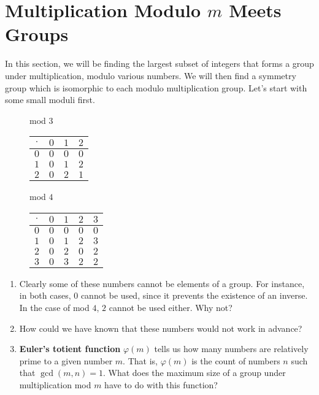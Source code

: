 \documentclass[../gatm.tex]{subfiles}
\begin{document}
\section{Multiplication Modulo $m$ Meets Groups}
\setcounter{problem_i}{0}

In this section, we will be finding the largest subset of integers that forms a group under multiplication, modulo various numbers. We will then find a symmetry group which is isomorphic to each modulo multiplication group. Let's start with some small moduli first.

\begin{figure}[h]
	\begin{center}
		\begin{minipage}[t]{0.45\textwidth}
			\centering
			mod $3$ \\
			\vspace*{\baselineskip}
			\begin{tabular}{c|ccc}
				\hline
				$\cdot$ & $0$ & $1$ & $2$ \\ \hline
				\rowcolor{light-gray}
				$0$ & $0$ & $0$ & $0$ \\
				$1$ & $0$ & $1$ & $2$ \\
				\rowcolor{light-gray}
				$2$ & $0$ & $2$ & $1$ \\ \hline
			\end{tabular}
		\end{minipage}
		\hfill
		\begin{minipage}[t]{0.45\textwidth}
			\centering
			mod $4$ \\
			\vspace*{\baselineskip}
			\begin{tabular}{c|cccc}
				\hline
				$\cdot$ & $0$ & $1$ & $2$ & $3$ \\ \hline
				\rowcolor{light-gray}
				$0$ & $0$ & $0$ & $0$ & $0$ \\
				$1$ & $0$ & $1$ & $2$ & $3$ \\
				\rowcolor{light-gray}
				$2$ & $0$ & $2$ & $0$ & $2$ \\
				$3$ & $0$ & $3$ & $2$ & $2$ \\ \hline
			\end{tabular}
		\end{minipage}
	\end{center}
\end{figure}

\begin{enumerate}
\item Clearly some of these numbers cannot be elements of a group. For instance, in both cases, $0$ cannot be used, since it prevents the existence of an inverse. In the case of mod $4$, $2$ cannot be used either. Why not?
\item How could we have known that these numbers would not work in advance?
\item \textbf{Euler's totient function} $\varphi(m)$ tells us how many numbers are relatively prime to a given number $m$. That is, $\varphi(m)$ is the count of numbers $n$ such that $\gcd(m,n)=1$. What does the maximum size of a group under multiplication mod $m$ have to do with this function?
\setcounter{problem_i}{\value{enumi}}
\end{enumerate}
\end{document}
